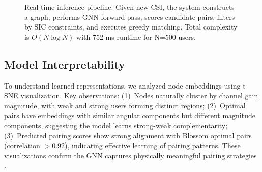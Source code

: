 \documentclass[conference]{IEEEtran}
\begin{document}
\begin{figure}[t]
\centering
\resizebox{\columnwidth}{!}{}
\caption{Real-time inference pipeline. Given new CSI, the system constructs a graph, performs GNN forward pass, scores candidate pairs, filters by SIC constraints, and executes greedy matching. Total complexity is $O(N \log N)$ with 752 ms runtime for N=500 users.}
\label{fig:inference_pipeline}
\end{figure}

\subsection{Model Interpretability}

To understand learned representations, we analyzed node embeddings using t-SNE visualization. Key observations: (1)~Nodes naturally cluster by channel gain magnitude, with weak and strong users forming distinct regions; (2)~Optimal pairs have embeddings with similar angular components but different magnitude components, suggesting the model learns strong-weak complementarity; (3)~Predicted pairing scores show strong alignment with Blossom optimal pairs (correlation $>0.92$), indicating effective learning of pairing patterns. These visualizations confirm the GNN captures physically meaningful pairing strategies .

\end{document}
